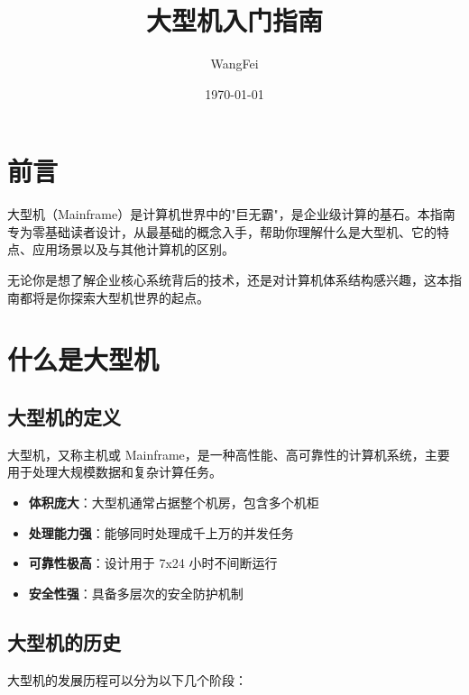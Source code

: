 \documentclass[12pt,UTF8]{ctexbook}
\title{\heiti\zihao{0} 大型机入门指南}
\author{WangFei}
\date{\today}
\begin{document}
\maketitle
\tableofcontents

\frontmatter
\chapter{前言}

大型机（Mainframe）是计算机世界中的"巨无霸"，是企业级计算的基石。本指南专为零基础读者设计，从最基础的概念入手，帮助你理解什么是大型机、它的特点、应用场景以及与其他计算机的区别。

无论你是想了解企业核心系统背后的技术，还是对计算机体系结构感兴趣，这本指南都将是你探索大型机世界的起点。

\mainmatter

\chapter{什么是大型机}
\label{chap:what_is_mainframe}

\section{大型机的定义}

大型机，又称主机或 Mainframe，是一种高性能、高可靠性的计算机系统，主要用于处理大规模数据和复杂计算任务。

\begin{itemize}[leftmargin=2cm]
    \item \textbf{体积庞大}：大型机通常占据整个机房，包含多个机柜
    \item \textbf{处理能力强}：能够同时处理成千上万的并发任务
    \item \textbf{可靠性极高}：设计用于 7x24 小时不间断运行
    \item \textbf{安全性强}：具备多层次的安全防护机制
\end{itemize}

\section{大型机的历史}

大型机的发展历程可以分为以下几个阶段：
\end{document}
